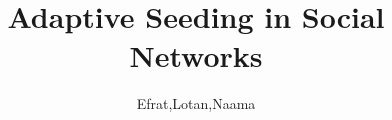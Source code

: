 \documentclass[tikz,dvipsnames]{vldb}
\begin{document}
\title{Adaptive Seeding in Social Networks}
\author{Efrat,Lotan,Naama}



\maketitle







\vspace{-1mm}
% 
% 







{\small

}
%
\end{document}

